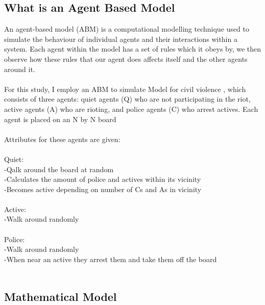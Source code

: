 \documentclass[11pt]{article}
\begin{document}
	\subsection{What is an Agent Based Model}
	An agent-based model (ABM) is a computational modelling technique used to simulate the behaviour of individual agents and their interactions within a system. Each agent within the model has a set of rules which it obeys by, we then observe how these rules that our agent does affects itself and the other agents around it.\\
	\\
	For this study, I employ an ABM to simulate \citet{epstein2002modeling} Model for civil violence , which consists of three agents: quiet agents (Q) who are not participating in the riot, active agents (A) who are rioting, and police agents (C) who arrest actives. Each agent is placed on an N by N board\\
	\\
	Attributes for these agents are given:\\
	\\
	Quiet:\\
	-Qalk around the board at random\\
	-Calculates the amount of police and actives within its vicinity\\
	-Becomes active depending on number of Cs and As in vicinity\\
	\\
	Active:\\
	-Walk around randomly\\
	\\
	Police:\\
	-Walk around randomly\\
	-When near an active they arrest them and take them off the board\\
	\\
	
	\subsection{Mathematical Model}

	
\end{document}
